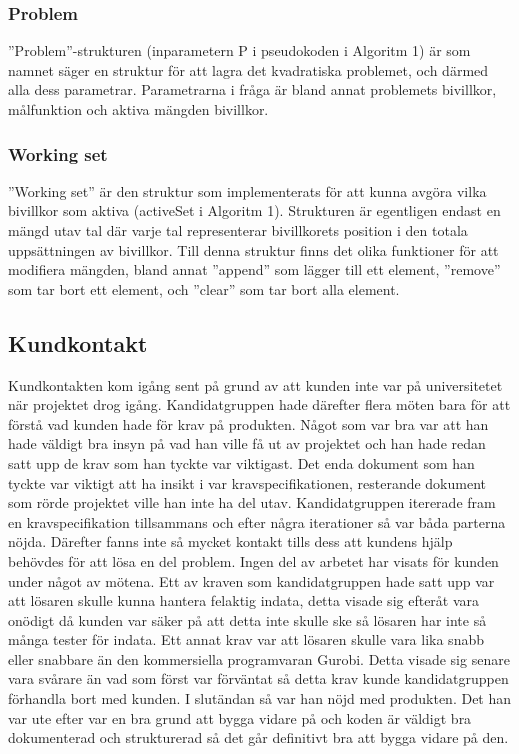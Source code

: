\subsubsection{Problem}
''Problem''-strukturen (inparametern P i pseudokoden i Algoritm 1) är som namnet säger en struktur för att lagra det kvadratiska problemet, och därmed alla dess parametrar. Parametrarna i fråga är bland annat problemets bivillkor, målfunktion och aktiva mängden bivillkor.

\subsubsection{Working set}
''Working set'' är den struktur som implementerats för att kunna avgöra vilka bivillkor som aktiva (activeSet i Algoritm 1). Strukturen är egentligen endast en mängd utav tal där varje tal representerar bivillkorets position i den totala uppsättningen av bivillkor. Till denna struktur finns det olika funktioner för att modifiera mängden, bland annat ''append'' som lägger till ett element, ''remove'' som tar bort ett element, och ''clear'' som tar bort alla element.




\subsection{Kundkontakt}
Kundkontakten kom igång sent på grund av att kunden inte var på universitetet när projektet drog igång. Kandidatgruppen hade därefter flera möten bara för att förstå vad kunden hade för krav på produkten. Något som var bra var att han hade väldigt bra insyn på vad han ville få ut av projektet och han hade redan satt upp de krav som han tyckte var viktigast. Det enda dokument som han tyckte var viktigt att ha insikt i var kravspecifikationen, resterande dokument som rörde projektet ville han inte ha del utav. Kandidatgruppen itererade fram en kravspecifikation tillsammans och efter några iterationer så var båda parterna nöjda. Därefter fanns inte så mycket kontakt tills dess att kundens hjälp behövdes för att lösa en del problem. Ingen del av arbetet har visats för kunden under något av mötena. 
\newline
\newline
Ett av kraven som kandidatgruppen hade satt upp var att lösaren skulle kunna hantera felaktig indata, detta visade sig efteråt vara onödigt då kunden var säker på att detta inte skulle ske så lösaren har inte så många tester för indata. Ett annat krav var att lösaren skulle vara lika snabb eller snabbare än den kommersiella programvaran Gurobi. Detta visade sig senare vara svårare än vad som först var förväntat så detta krav kunde kandidatgruppen förhandla bort med kunden. I slutändan så var han nöjd med produkten. Det han var ute efter var en bra grund att bygga vidare på och koden är väldigt bra dokumenterad och strukturerad så det går definitivt bra att bygga vidare på den. 

